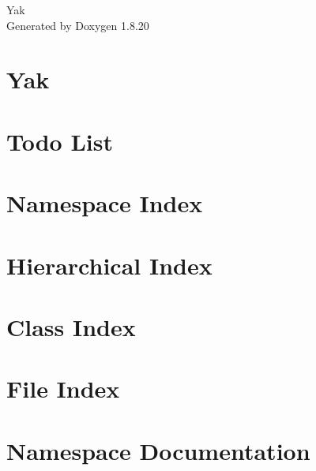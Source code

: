 \let\mypdfximage\pdfximage\def\pdfximage{\immediate\mypdfximage}\documentclass[twoside]{book}
\newcommand{\+}{\discretionary{\mbox{\scriptsize$\hookleftarrow$}}{}{}}
\newcommand{\clearemptydoublepage}{%
  \newpage{\pagestyle{empty}\cleardoublepage}%
}
\begin{document}
\hypersetup{pageanchor=false,
             bookmarksnumbered=true,
             pdfencoding=unicode
            }
\begin{titlepage}
\vspace*{7cm}
\begin{center}%
{\Large Yak }\\
\vspace*{1cm}
{\large Generated by Doxygen 1.8.20}\\
\end{center}
\end{titlepage}
\clearemptydoublepage
{}
\tableofcontents
\clearemptydoublepage
{}
\hypersetup{pageanchor=true}

\chapter{Yak}
\label{index}\hypertarget{index}{}
\chapter{Todo List}
\label{todo}

\chapter{Namespace Index}

\chapter{Hierarchical Index}

\chapter{Class Index}

\chapter{File Index}

\chapter{Namespace Documentation}






\end{document}
